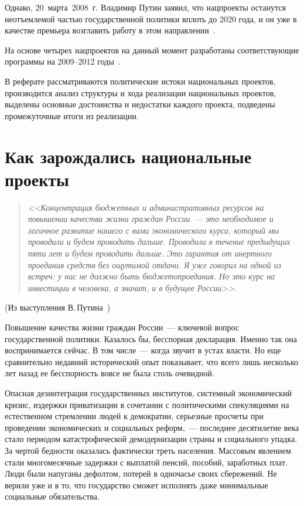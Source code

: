\documentclass[article, 12pt, russian, oneside]{ncc}
\newcounter{rom}
\begin{document}
Однако, 20~марта~2008~г. Владимир Путин заявил, что нацпроекты
останутся неотъемлемой частью государственной политики вплоть до 2020
года, и он уже в качестве премьера возглавить работу в этом
направлении~\cite{Gazeta}.

На основе четырех нацпроектов на данный момент разработаны
соответствующие программы на 2009--2012 годы~\cite{PNP}.

В реферате рассматриваются политические истоки национальных проектов,
производится анализ структуры и хода реализации национальных проектов,
выделены основные достоинства и недостатки каждого проекта, подведены
промежуточные итоги из реализации.

\newpage

\section{Как зарождались национальные проекты}

\begin{quote}
  \emph{<<Концентрация бюджетных и административных ресурсов на
    повышении качества жизни граждан России~--- это необходимое и
    логичное развитие нашего с вами экономического курса, который мы
    проводили и будем проводить дальше. Проводили в течение предыдущих
    пяти лет и будем проводить дальше. Это гарантия от инертного
    проедания средств без ощутимой отдачи. Я уже говорил на одной из
    встреч: у нас не должно быть бюджетопроедания. Но это курс на
    инвестиции в человека, а значит, и в будущее России>>.}
\end{quote}
\begin{flushright}
  (Из выступления В.\,Путина~\cite{Putin_RG})
\end{flushright}

Повышение качества жизни граждан России~--- ключевой вопрос
государственной политики. Казалось бы, бесспорная декларация. Именно
так она воспринимается сейчас. В том числе~--- когда звучит в устах
власти. Но еще сравнительно недавний исторический опыт показывает, что
всего лишь несколько лет назад ее бесспорность вовсе не была столь
очевидной.

Опасная дезинтеграция государственных институтов, системный
экономический кризис, издержки приватизации в сочетании с
политическими спекуляциями на естественном стремлении людей к
демократии, серьезные просчеты при проведении экономических и
социальных реформ,~--- последнее десятилетие  века стало
периодом катастрофической демодернизации страны и социального
упадка. За чертой бедности оказалась фактически треть
населения. Массовым явлением стали многомесячные задержки с выплатой
пенсий, пособий, заработных плат. Люди были напуганы дефолтом, потерей
в одночасье своих сбережений. Не верили уже и в то, что государство
сможет исполнять даже минимальные социальные обязательства.
\end{document}
